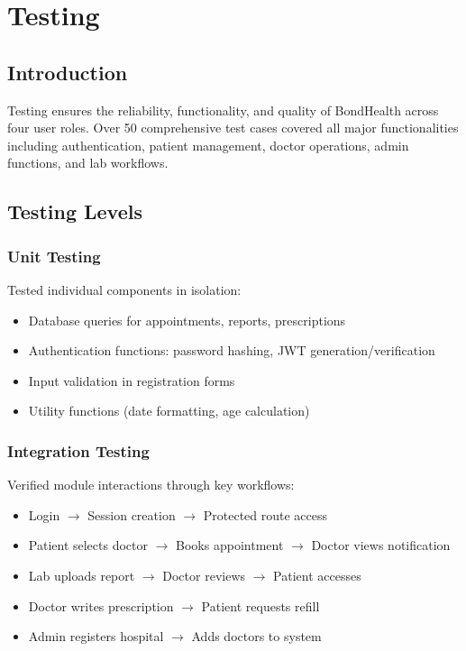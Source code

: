 \chapter{Testing}

\section{Introduction}
Testing ensures the reliability, functionality, and quality of BondHealth across four user roles. Over 50 comprehensive test cases covered all major functionalities including authentication, patient management, doctor operations, admin functions, and lab workflows.

\section{Testing Levels}

\subsection{Unit Testing}
Tested individual components in isolation:
\begin{itemize}
    \item Database queries for appointments, reports, prescriptions
    \item Authentication functions: password hashing, JWT generation/verification
    \item Input validation in registration forms
    \item Utility functions (date formatting, age calculation)
\end{itemize}

\subsection{Integration Testing}
Verified module interactions through key workflows:
\begin{itemize}
    \item Login $\rightarrow$ Session creation $\rightarrow$ Protected route access
    \item Patient selects doctor $\rightarrow$ Books appointment $\rightarrow$ Doctor views notification
    \item Lab uploads report $\rightarrow$ Doctor reviews $\rightarrow$ Patient accesses
    \item Doctor writes prescription $\rightarrow$ Patient requests refill
    \item Admin registers hospital $\rightarrow$ Adds doctors to system
\end{itemize}

